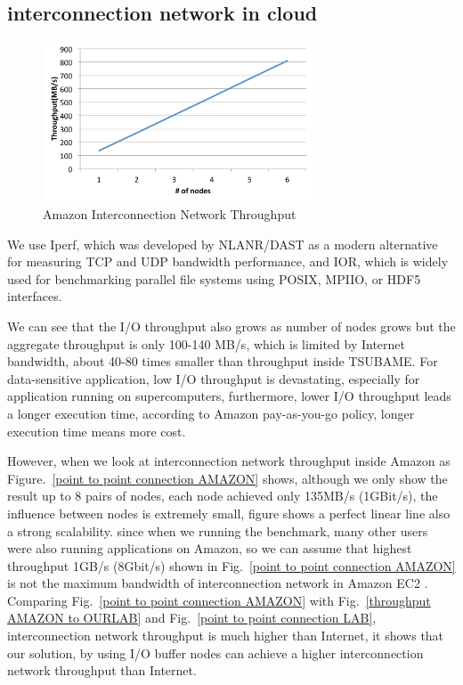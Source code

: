 \subsection{interconnection network in cloud}
\begin{figure}
\centering
\includegraphics[width=8cm]{img/amazon_throughput}
\caption{Amazon Interconnection Network Throughput}
\label{}
\end{figure}

We use Iperf\cite{iperf}, which was developed by NLANR/DAST as a modern alternative for measuring
TCP and UDP bandwidth performance, and IOR\cite{IOR}, which is widely used for benchmarking
parallel file systems using POSIX, MPIIO, or HDF5 interfaces.

We can see that the I/O throughput also grows as number of nodes grows but the aggregate throughput
is only 100-140 MB/s, which is limited by Internet bandwidth, about 40-80 times smaller than
throughput inside TSUBAME.
For data-sensitive application, low I/O throughput is devastating, especially for application
running on supercomputers, furthermore, lower I/O throughput leads a longer execution time,
according to Amazon pay-as-you-go policy, longer execution time means more cost.

However, when we look at interconnection network throughput inside Amazon as Figure.~\ref{point to
point connection AMAZON} shows, although we only show the result up to 8 pairs of nodes, each node
achieved only 135MB/s (1GBit/s), the influence between nodes is extremely small, figure shows a
perfect linear line also a strong scalability.
since when we running the benchmark, many other users were also running applications on Amazon, so
we can assume that highest throughput 1GB/s (8Gbit/s) shown in Fig.~\ref{point to point connection
AMAZON} is not the maximum bandwidth of interconnection network in Amazon EC2 .
Comparing Fig.~\ref{point to point connection AMAZON} with Fig.~\ref{throughput AMAZON to OURLAB} 
and Fig.~\ref{point to point connection LAB}, interconnection network throughput is much higher than
Internet, it shows that our solution, by using I/O buffer nodes can achieve a higher
interconnection network throughput than Internet.
